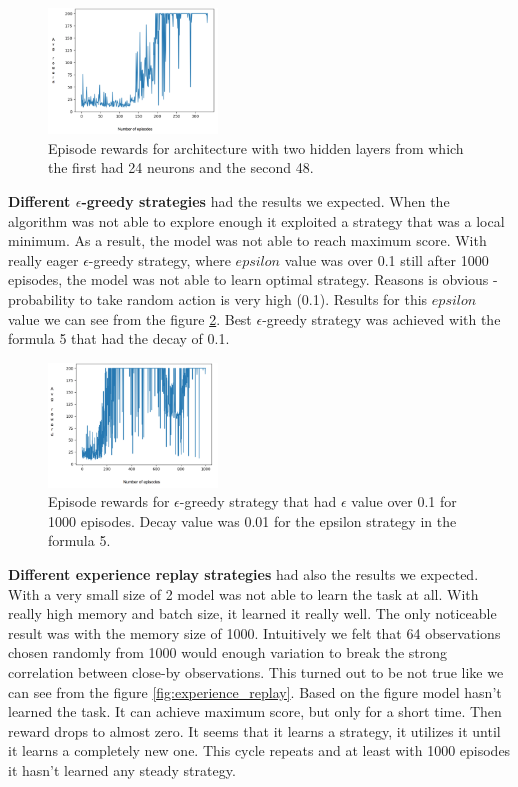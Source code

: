 \begin{figure}[H]
    \centering
    \includegraphics[width=0.4\textwidth]{images/nn_24_48.png}
    \caption{
    Episode rewards for architecture with two hidden layers from which the first had 24 neurons and the second 48.
    }
    \label{fig:nn_24_48}
\end{figure}

\textbf{Different $\epsilon$-greedy strategies} had the results we expected. When the algorithm was not able to explore enough it exploited a strategy that was a local minimum. As a result, the model was not able to reach maximum score.
With really eager $\epsilon$-greedy strategy, where $epsilon$ value was over 0.1 still after 1000 episodes, the model was not able to learn optimal strategy. Reasons is obvious - probability to take random action is very high (0.1). Results for this $epsilon$ value we can see from the figure \ref{fig:e-greedy}.
Best $\epsilon$-greedy strategy was achieved with the formula 5 that had the decay of 0.1.

\begin{figure}[H]
    \centering
    \includegraphics[width=0.4\textwidth]{images/e-greedy.png}
    \caption{
    Episode rewards for $\epsilon$-greedy strategy that had $\epsilon$ value over 0.1 for 1000 episodes. Decay value was 0.01 for the epsilon strategy in the formula 5.
    }
    \label{fig:e-greedy}
\end{figure}

\textbf{Different experience replay strategies} had also the results we expected. With a very small size of 2 model was not able to learn the task at all. With really high memory and batch size, it learned it really well. The only noticeable result was with the memory size of 1000. Intuitively we felt that 64 observations chosen randomly from 1000 would enough variation to break the strong correlation between close-by observations. This turned out to be not true like we can see from the figure \ref{fig:experience_replay}. Based on the figure model hasn't learned the task. It can achieve maximum score, but only for a short time. Then reward drops to almost zero. It seems that it learns a strategy, it utilizes it until it learns a completely new one. This cycle repeats and at least with 1000 episodes it hasn't learned any steady strategy.

